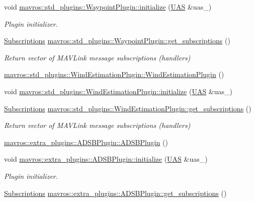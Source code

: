 \begin{DoxyCompactItemize}
void \mbox{\hyperlink{group__plugin_gaeacb83ea00ebb3446b99f88a573c9a86}{mavros\+::std\+\_\+plugins\+::\+Waypoint\+Plugin\+::initialize}} (\mbox{\hyperlink{classmavros_1_1UAS}{U\+AS}} \&uas\+\_\+)
\begin{DoxyCompactList}\small\item\em Plugin initializer. \end{DoxyCompactList}\item 
\mbox{\hyperlink{group__plugin_ga8967d61fc77040e0c3ea5a4585d62a09}{Subscriptions}} \mbox{\hyperlink{group__plugin_ga27f42c57511291aaaf46e268e4833ed2}{mavros\+::std\+\_\+plugins\+::\+Waypoint\+Plugin\+::get\+\_\+subscriptions}} ()
\begin{DoxyCompactList}\small\item\em Return vector of M\+A\+V\+Link message subscriptions (handlers) \end{DoxyCompactList}\item 
\mbox{\hyperlink{group__plugin_gaf656179c4da289caeea0c7ee36c25de2}{mavros\+::std\+\_\+plugins\+::\+Wind\+Estimation\+Plugin\+::\+Wind\+Estimation\+Plugin}} ()
\item 
void \mbox{\hyperlink{group__plugin_ga6811f85521065b479c973b2d82353927}{mavros\+::std\+\_\+plugins\+::\+Wind\+Estimation\+Plugin\+::initialize}} (\mbox{\hyperlink{classmavros_1_1UAS}{U\+AS}} \&uas\+\_\+)
\item 
\mbox{\hyperlink{group__plugin_ga8967d61fc77040e0c3ea5a4585d62a09}{Subscriptions}} \mbox{\hyperlink{group__plugin_ga7db9ebfdb92e2537b3b3b844a2483617}{mavros\+::std\+\_\+plugins\+::\+Wind\+Estimation\+Plugin\+::get\+\_\+subscriptions}} ()
\begin{DoxyCompactList}\small\item\em Return vector of M\+A\+V\+Link message subscriptions (handlers) \end{DoxyCompactList}\item 
\mbox{\hyperlink{group__plugin_ga1731629adbcab3ef7d49e6b838453c0c}{mavros\+::extra\+\_\+plugins\+::\+A\+D\+S\+B\+Plugin\+::\+A\+D\+S\+B\+Plugin}} ()
\item 
void \mbox{\hyperlink{group__plugin_ga15664310460e851e8bb761ce18c68677}{mavros\+::extra\+\_\+plugins\+::\+A\+D\+S\+B\+Plugin\+::initialize}} (\mbox{\hyperlink{classmavros_1_1UAS}{U\+AS}} \&uas\+\_\+)
\begin{DoxyCompactList}\small\item\em Plugin initializer. \end{DoxyCompactList}\item 
\mbox{\hyperlink{group__plugin_ga8967d61fc77040e0c3ea5a4585d62a09}{Subscriptions}} \mbox{\hyperlink{group__plugin_gac151290664f8ba679ec27bd8c55b031e}{mavros\+::extra\+\_\+plugins\+::\+A\+D\+S\+B\+Plugin\+::get\+\_\+subscriptions}} ()

\end{DoxyCompactItemize}
